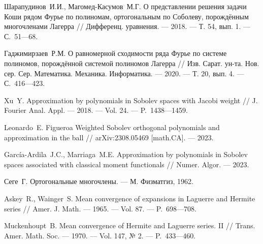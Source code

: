 \begin{thebibliography}{11}
{Шарапудинов~И.И., Магомед-Касумов~М.Г.} 
О представлении решения задачи Коши рядом Фурье по полиномам, ортогональным по Соболеву, порождённым многочленами Лагерра 
// 
Дифференц. уравнения. 
--- 2018. 
--- Т. 54, вып. 1. 
--- С.~51---68.





{Гаджимирзаев~Р.М.} 
О равномерной сходимости ряда Фурье по системе полиномов, порождённой системой полиномов Лагерра 
// 
Изв. Сарат. ун-та. Нов. сер. Сер. Математика. Механика. Информатика. 
--- 2020. 
--- Т. 20, вып. 4. 
--- С.~416---423.






{Xu~Y.} 
Approximation by polynomials in Sobolev spaces with Jacobi weight 
// 
J. Fourier Anal. Appl. 
--- 2018. 
--- Vol. 24. 
--- P.~1438---1459.






{Leonardo~E. Figueroa} 
Weighted Sobolev orthogonal polynomials and approximation in the ball 
// 
arXiv:2308.05469 [math.CA].
--- 2023.





{Garc\'ia-Ardila~J.C., Marriaga~M.E.}
Approximation by polynomials in Sobolev spaces associated with classical moment functionals 
//
Numer. Algor.
--- 2023.





			
{Сеге~Г.} 
Ортогональные многочлены. 
--- М. Физматгиз, 1962.





{Askey~R., Wainger~S.} 
Mean convergence of expansions in Laguerre and Hermite series 
// 
Amer. J. Math.
--- 1965.
--- Vol. 87.
--- P.~698---708.





{Muckenhoupt~B.} 
Mean convergence of Hermite and Laguerre series. II 
// 
Trans. Amer. Math. Soc. 
--- 1970.
--- Vol. 147, № 2.
--- P.~433---460.





	

\end{thebibliography}
